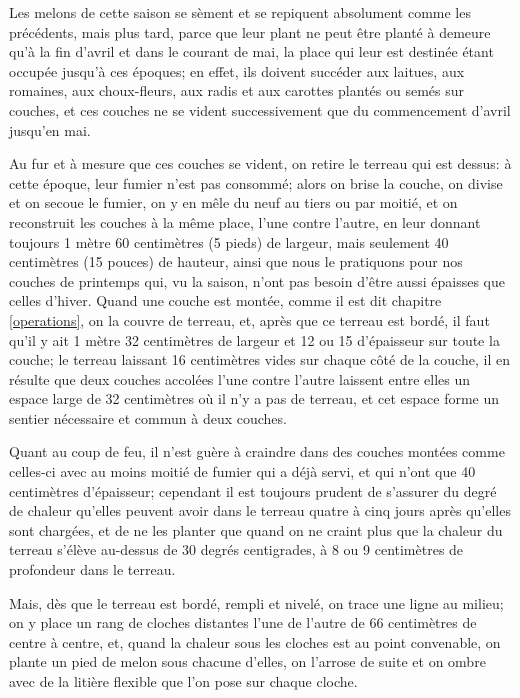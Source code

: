 \documentclass[10pt,a4paper]{book}
\begin{document}
Les melons de cette saison se sèment et se repiquent absolument comme les précédents, mais plus tard, parce que leur plant ne peut être planté à demeure qu'à la fin d'avril et dans le courant de mai, la place qui leur est destinée étant occupée jusqu'à ces époques; en effet, ils doivent succéder aux laitues, aux romaines, aux choux-fleurs, aux radis et aux carottes plantés ou semés sur couches, et ces couches ne se vident successivement que du commencement d'avril jusqu'en mai.

Au fur et à mesure que ces couches se vident, on retire le terreau qui est dessus: à cette époque, leur fumier n'est pas consommé; alors on brise la couche, on divise et on secoue le fumier, on y en mêle du neuf au tiers ou par moitié, et on reconstruit les couches à la même place, l'une contre l'autre, en leur donnant toujours 1 mètre 60 centimètres (5 pieds) de largeur, mais seulement 40 centimètres (15 pouces) de hauteur, ainsi que nous le pratiquons pour nos couches de printemps qui, vu la saison, n'ont pas besoin d'être aussi épaisses que celles d'hiver. Quand une couche est montée, comme il est dit chapitre \ref{operations}, on la couvre de terreau, et, après que ce terreau est bordé, il faut qu'il y ait 1 mètre 32 centimètres de largeur et 12 ou 15 d'épaisseur sur toute la couche; le terreau laissant 16 centimètres vides sur chaque côté de la couche, il en résulte que deux couches accolées l'une contre l'autre laissent entre elles un espace large de 32 centimètres où il n'y a pas de terreau, et cet espace forme un sentier nécessaire et commun à deux couches.

Quant au coup de feu, il n'est guère à craindre dans des couches montées comme celles-ci avec au moins moitié de fumier qui a déjà servi, et qui n'ont que 40 centimètres d'épaisseur; cependant il est toujours prudent de s'assurer du degré de chaleur qu'elles peuvent avoir dans le terreau quatre à cinq jours après qu'elles sont chargées, et de ne les planter que quand on ne craint plus que la chaleur du terreau s'élève au-dessus de 30 degrés centigrades, à 8 ou 9 centimètres de profondeur dans le terreau.

Mais, dès que le terreau est bordé, rempli et nivelé, on trace une ligne au milieu; on y place un rang de cloches distantes l'une de l'autre de 66 centimètres de centre à centre, et, quand la chaleur sous les cloches est au point convenable, on plante un pied de melon sous chacune d'elles, on l'arrose de suite et on ombre avec de la litière flexible que l'on pose sur chaque cloche.
\end{document}
